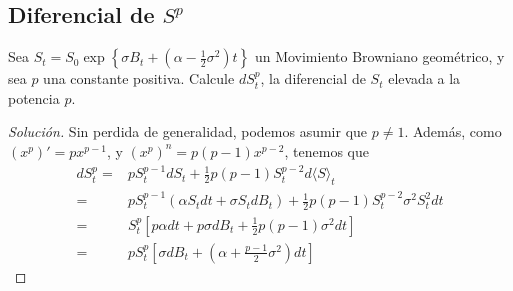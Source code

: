 \documentclass[11pt,notitlepage]{article}
\begin{document}
\subsection{Diferencial de \(S^p\)}
Sea \(S_t=S_0 \exp\left\{\sigma B_t+\left(\alpha-\frac{1}{2}\sigma^{2}\right)t\right\}\) un Movimiento Browniano geométrico, y sea \(p\) una constante positiva. Calcule \(dS^p_t\), la diferencial de \(S_t\) elevada a la potencia \(p\).
\begin{proof}[Solución]
Sin perdida de generalidad, podemos asumir que \(p \neq 1\). Además, como  \((x^p)'=px^{p-1}\), y \((x^p)^n=p(p-1)x^{p-2}\), tenemos que
\begin{align*}
    dS^p_t=& pS^{p-1}_tdS_t+\frac{1}{2}p(p-1)S_t^{p-2}d\langle S\rangle_t\\
    =& pS^{p-1}_t\left(\alpha S_tdt+\sigma S_tdB_t\right)+\frac{1}{2}p(p-1)S_t^{p-2}\sigma^2S_t^2dt\\
    =& S_t^p\left[p\alpha dt+p\sigma dB_t+\frac{1}{2}p(p-1)\sigma^2dt\right]\\
    =&pS_t^p\left[\sigma dB_t+\left(\alpha+\frac{p-1}{2}\sigma^2\right)dt\right]
\end{align*}
\end{proof}
\end{document}
